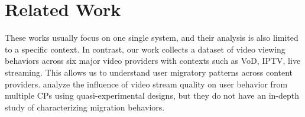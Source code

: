 
\section{Related Work} \label{sec:relatedwork}


These works usually focus on one single system, and their analysis is also limited to a specific context. In contrast, our work collects a dataset of video viewing behaviors across six major video providers with contexts such as VoD, IPTV, live streaming. This allows us to understand user migratory patterns across content providers. \cite{roberts1997weak} analyze the influence of video stream quality on user behavior from multiple CPs using quasi-experimental designs, but they do not have an in-depth study of characterizing migration behaviors.  \cite{metropolis1953equation}\cite{hastings1970monte}

